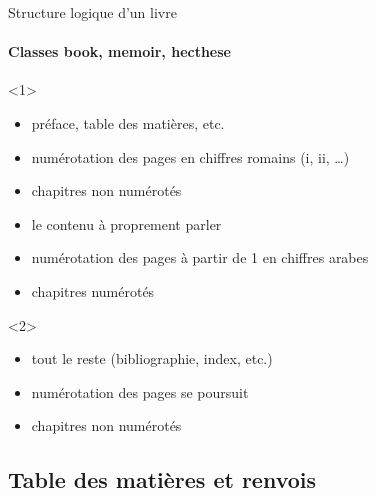 \begin{frame}[fragile]{Structure logique d'un livre}
	\framesubtitle{Classes book, memoir, hecthese}

\begin{onlyenv}<1>
\begin{codesource}
	\frontmatter
\end{codesource}	
	\begin{itemize}
		\item préface, table des matières, etc.
		\item numérotation des pages en chiffres romains (i, ii, \ldots)
		\item chapitres non numérotés
	\end{itemize}
\begin{codesource}
	\mainmatter
\end{codesource}	
	\begin{itemize}
		\item le contenu à proprement parler
		\item numérotation des pages à partir de 1 en chiffres arabes
		\item chapitres numérotés
	\end{itemize}
\end{onlyenv}

\begin{onlyenv}<2>
\begin{codesource}
	\backmatter
\end{codesource}
	\begin{itemize}
		\item tout le reste (bibliographie, index, etc.)
		\item numérotation des pages se poursuit
		\item chapitres non numérotés
	\end{itemize}
\end{onlyenv}
\end{frame}

\subsection{Table des matières et renvois}

